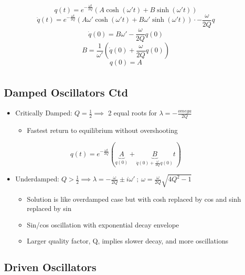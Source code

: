 \documentclass[a4paper,11pt,normalem]{article}
\begin{document}
\[
    q(t) = e^{-\frac{\omega t}{2Q}}(A\cosh(\omega 't) + B\sinh(\omega 't)) \]
\[
    \dot{q}(t) = e^{-\frac{\omega t}{2Q}}(A\omega '\cosh(\omega 't) + B\omega '\sinh(\omega 't))\cdot -\frac{\omega}{2Q}q \]
\[
    \dot{q}(0) = B\omega ' - \frac{\omega}{2Q}q(0) \] \[
    B = \frac{1}{\omega '}(\dot{q}(0) + \frac{\omega}{2Q}q(0)) \] \[
    q(0) = A
\]

\section{}\label{lecture-5}

\subsection{Damped Oscillators Ctd}\label{damped-oscillators-ctd}
\begin{itemize}
\item
  Critically Damped: \(Q = \frac{1}{2} \implies\) 2 equal roots for
  \(\lambda = -\frac{omega}{2Q}\)
  \begin{itemize}
  \item
    Fastest return to equilibrium without overshooting
  \end{itemize}
\end{itemize}

\[
    q(t) = e^{-\frac{\omega t}{2Q}}(\underbrace{A}_{q(0)} + \underbrace{B}_{\dot{q}(0) + \frac{\omega}{2Q}q(0)}t) \]
\[
\]

\begin{itemize}
\item
  Underdamped:
  \(Q > \frac{1}{2} \implies \lambda = -\frac{\omega}{2Q} \pm i\omega ' ~;~ \omega = \frac{\omega}{2Q}\sqrt{4Q^2 - 1}\)
  \begin{itemize}
  \item
    Solution is like overdamped case but with cosh replaced by cos and
    sinh replaced by sin
  \item
    Sin/cos oscillation with exponential decay envelope
  \item
    Larger quality factor, Q, implies slower decay, and more
    oscillations
  \end{itemize}
\end{itemize}

\subsection{Driven Oscillators}\label{driven-oscillators}
\end{document}
